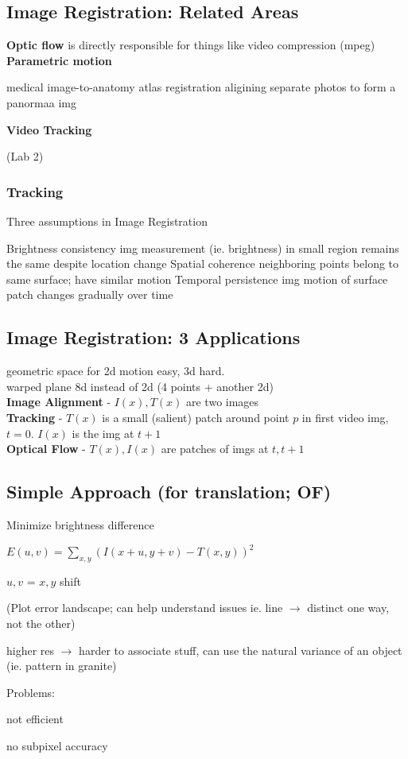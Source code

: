 \documentclass{article}
\begin{document}
\subsection{Image Registration: Related Areas}
\textbf{Optic flow} is directly responsible for things like video compression (mpeg)\\
\textbf{Parametric motion}
\begin{outline}
    \1 medical image-to-anatomy atlas registration
    \1 aligining separate photos to form a panormaa img
\end{outline}
\noindent
\textbf{Video Tracking}
\begin{outline}
    \1 (Lab 2)
\end{outline}
\subsubsection{Tracking}
Three assumptions in Image Registration
\begin{outline}[enumerate]
    \1 Brightness consistency
        \2 img measurement (ie. brightness) in small region remains the same despite location change
    \1 Spatial coherence
        \2 neighboring points belong to same surface; have similar motion
    \1 Temporal persistence
        \2 img motion of surface patch changes gradually over time
\end{outline}

\subsection{Image Registration: 3 Applications}
geometric space for 2d motion easy, 3d hard.
\\
warped plane 8d instead of 2d (4 points + another 2d)
\\
\textbf{Image Alignment} - $I(x), T(x)$ are two images\\
\textbf{Tracking} - $T(x)$ is a small (salient) patch around point $p$ in first video img, $t=0$. $I(x)$ is the img at $t+1$\\
\textbf{Optical Flow} - $T(x),I(x)$ are patches of imgs at $t,t+1$

\subsection{Simple Approach (for translation; OF)}
Minimize brightness difference
\begin{list}{}{}
    \item $E(u,v) = \sum_{x,y}^{}(I(x+u, y+v) - T(x,y))^2$
    \item $u,v$ = $x, y $ shift
    \item (Plot error landscape; can help understand issues ie. line $\to$ distinct one way, not the other)
    \item higher res $\to$ harder to associate stuff, can use the natural variance of an object (ie. pattern in granite)
\end{list}
Problems:
\begin{list}{}{}
    \item not efficient
    \item no subpixel accuracy
\end{list}
\end{document}
